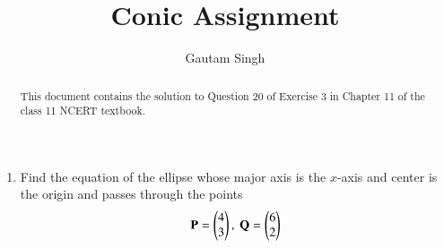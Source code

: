 \documentclass[journal,12pt,twocolumn]{IEEEtran}
\renewcommand{\vec}[1]{\boldsymbol{\mathbf{#1}}}
\begin{document}
\vspace{3cm}
\title{Conic Assignment}
\author{Gautam Singh}
\maketitle
\bigskip

\begin{abstract}
    This document contains the solution to Question 20 of Exercise 3 in Chapter
    11 of the class 11 NCERT textbook.
\end{abstract}

\begin{enumerate}
    \item Find the equation of the ellipse whose major axis is the $x$-axis and
    center is the origin and passes through the points
    \begin{align}
        \vec{P} = \myvec{4\\3},\ \vec{Q} = \myvec{6\\2}
    \end{align}


\end{enumerate}
\end{document}
